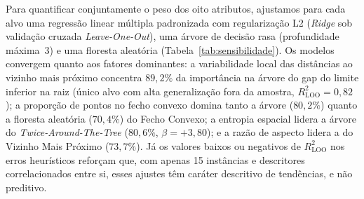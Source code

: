 Para quantificar conjuntamente o peso dos oito atributos, ajustamos para cada alvo uma
regressão linear múltipla padronizada com regularização L2 (\textit{Ridge} sob validação
cruzada \textit{Leave-One-Out}), uma árvore de decisão rasa (profundidade máxima~3) e uma
floresta aleatória (Tabela~\ref{tab:sensibilidade}). Os modelos convergem quanto aos fatores
dominantes: a variabilidade local das distâncias ao vizinho mais próximo concentra $89{,}2\%$
da importância na árvore do gap do limite inferior na raiz (único alvo com alta generalização
fora da amostra, $R^2_{\text{LOO}} = 0{,}82$); a proporção de pontos no fecho convexo domina
tanto a árvore ($80{,}2\%$) quanto a floresta aleatória ($70{,}4\%$) do Fecho Convexo; a
entropia espacial lidera a árvore do \textit{Twice-Around-The-Tree} ($80{,}6\%$, $\beta = +3{,}80$);
e a razão de aspecto lidera a do Vizinho Mais Próximo ($73{,}7\%$). Já os valores baixos ou
negativos de $R^2_{\text{LOO}}$ nos erros heurísticos reforçam que, com apenas 15 instâncias e
descritores correlacionados entre si, esses ajustes têm caráter descritivo de tendências, e
não preditivo.

\begin{table}[htbp]
  \centering
  \caption{Resumo da modelagem de sensibilidade (15 instâncias): atributo dominante na árvore
  de decisão, correlação de Spearman ($\rho$), peso padronizado na regressão \textit{Ridge}
  ($\beta$), importâncias na árvore e na floresta aleatória (RF), e $R^2_{\text{LOO}}$ da
  \textit{Ridge}.}
  \label{tab:sensibilidade}
  \scriptsize
\end{table}


